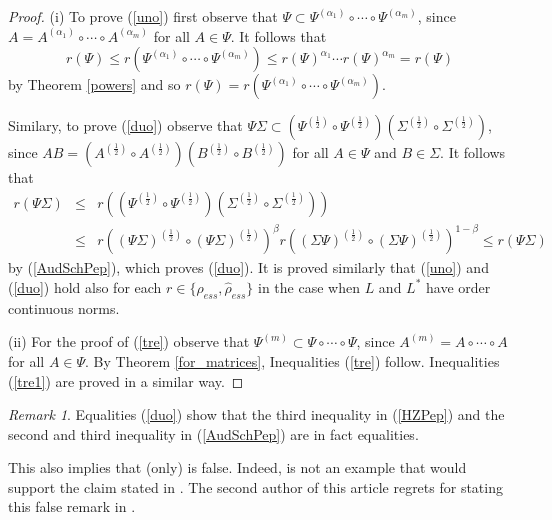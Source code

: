 \documentclass[12pt, reqno]{amsart}
\theoremstyle{definition}
\theoremstyle{remark}
\newtheorem{remark}[theorem]{Remark}
\numberwithin{equation}{section}
\begin{document}
\begin{proof}
(i) To prove (\ref{uno}) first observe that
$ \Psi\subset\Psi^{(\alpha_1)}\circ\cdots\circ\Psi^{(\alpha_m)}$, since $ A=A^{(\alpha_1)}\circ\cdots\circ
A^{(\alpha_m)}$ for all $A\in\Psi $. It follows that $$r(\Psi)\le r(\Psi^{(\alpha_1)}\circ\cdots\circ\Psi^{(\alpha_m)})
\le r(\Psi)^{\alpha_1}\cdots r(\Psi)^{\alpha_m}=r(\Psi)$$ by Theorem \ref{powers} and so $r(\Psi)=r(\Psi^{(\alpha_1)}\circ\cdots\circ\Psi^{(\alpha_m)})$.

Similary, to prove (\ref{duo}) observe that $\Psi\Sigma\subset(\Psi^{(\frac{1}{2})}\circ\Psi^{(\frac{1}{2})})(\Sigma^{(\frac{1}{2})}\circ\Sigma^
{(\frac{1}{2})})$, since $AB=(A^{(\frac{1}{2})}\circ A^{(\frac{1}{2})})(B^{(\frac{1}{2})}\circ B^{(\frac{1}{2})})$ for all $A\in\Psi$ and $B\in\Sigma$. It follows that 
\begin{eqnarray}
\nonumber
r(\Psi\Sigma)&\le &r((\Psi^{(\frac{1}{2})}\circ\Psi^{(\frac{1}{2})})(\Sigma^{(\frac{1}{2})}
\circ\Sigma^{(\frac{1}{2})}))\\
&\le & r \left((\Psi \Sigma)^{\left(\frac{1}{2}\right)} \circ (\Psi \Sigma)^{\left(\frac{1}{2}\right)}\right) ^{\beta}   r \left((\Sigma\Psi)^{\left(\frac{1}{2}\right)} \circ ( \Sigma \Psi)^{\left(\frac{1}{2}\right)}\right) ^{1-\beta} \le r(\Psi\Sigma)
\nonumber
\end{eqnarray}
by (\ref{AudSchPep}), which proves (\ref{duo}). It is proved similarly that (\ref{uno}) and (\ref{duo}) hold also for each $r\in \{ \rho _{ess}, \hat{\rho} _{ess}\}$ in the case when $L$ and $L^*$ have order continuous norms.

(ii) For the proof of (\ref{tre}) observe that $\Psi^{(m)}\subset\Psi\circ\cdots\circ\Psi$, since $A^{(m)}=A\circ\cdots\circ A$ for all $A\in\Psi$. By Theorem \ref{for_matrices}, Inequalities (\ref{tre}) follow. Inequalities (\ref{tre1}) are proved in a similar way. %
\end{proof}
\begin{remark}{\rm
Equalities (\ref{duo}) show that  the third inequality in (\ref{HZPep}) and the second and third inequality in (\ref{AudSchPep})  are in fact equalities.

This also implies that (only) \cite[Remark 3.6]{P19} is false. Indeed, 
\cite[Example 3.11]{P12} is not an example  that would support the claim stated in \cite[Remark 3.6]{P19}. The second author of this article regrets for  stating this false remark in \cite{P19}.
}
\end{remark}
\end{document}
